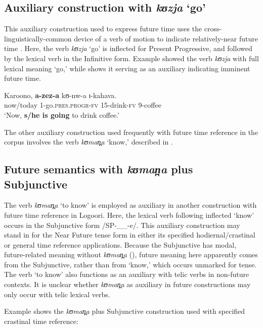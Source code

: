 \documentclass[output=paper]{langsci/langscibook}
\begin{document}
\subsection{Auxiliary construction with \textit{kʊzja }‘go’} \label{sec:sarvasy:7.2}

This auxiliary construction used to express future time uses the cross-linguistically-common device of a verb of motion to indicate relatively-near future time \citep[161-163]{HeineKuteva2004}. Here, the verb \textit{kʊzja }‘go’ is inflected for Present Progressive, and followed by the lexical verb in the Infinitive form. Example  showed the verb \textit{kʊzja }with full lexical meaning ‘go,’ while  shows it serving as an auxiliary indicating imminent future time. 

\ea\label{ex:sarvasy:19}
\gll Karoono,   \textbf{a-zez-a}      kʊ-nw-a  ɪ{}-kahava. \\
now/today  1-go.\textsc{pres.progr-fv}  15-drink-\textsc{fv}  9-coffee \\
\glt ‘Now, \textbf{s/he is going} to drink coffee.’
\z

The other auxiliary construction used frequently with future time reference in the corpus involves the verb \textit{kʊman̪a }‘know,’ described in .

\subsection{Future semantics with \textit{k}\textit{ʊman̪a}\textit{ }plus Subjunctive} \label{sec:sarvasy:7.3}

The verb \textit{kʊman̪a }‘to know’ is employed as auxiliary in another construction with future time reference in Logoori. Here, the lexical verb following inflected ‘know’ occurs in the Subjunctive form /SP-\_\_-e/. This auxiliary construction may stand in for the Near Future tense form in either its specified hodiernal/crastinal or general time reference applications. Because the Subjunctive has modal, future-related meaning without \textit{kʊman̪a} (), future meaning here apparently comes from the Subjunctive, rather than from ‘know,’ which occurs unmarked for tense. The verb ‘to know’ also functions as an auxiliary with telic verbs in non-future contexts. It is unclear whether \textit{kʊman̪a }as auxiliary in future constructions may only occur with telic lexical verbs.

Example  shows the \textit{kʊman̪a }plus Subjunctive construction used with specified crastinal time reference:
\end{document}
